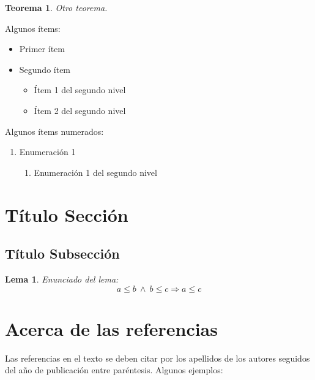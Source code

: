 \documentclass[10pt,twoside,spanish]{article}
\newtheorem{theorem}{Teorema}[section]
\newtheorem{lemma}{Lema}[section]
\numberwithin{equation}{section}
\begin{document}
\begin{theorem}
Otro teorema.
\end{theorem}

Algunos ítems:

\begin{itemize}
\item Primer ítem

\item Segundo ítem

\begin{itemize}
\item Ítem 1 del segundo nivel

\item Ítem 2 del segundo nivel
\end{itemize}
\end{itemize}

Algunos ítems numerados:

\begin{enumerate}
\item Enumeración 1

\begin{enumerate}
\item Enumeración 1 del segundo nivel
\end{enumerate}
\end{enumerate}

\section{Título Sección\label{Sec 2}}

\subsection{Título Subsección}

\begin{lemma}
Enunciado del lema:%
\begin{equation}
a\leq b~\wedge ~b\leq c\Rightarrow a\leq c  \label{Propiedad transitiva}
\end{equation}
\end{lemma}

\section{Acerca de las referencias}

Las referencias en el texto se deben citar por los apellidos de los autores
seguidos del año de publicación entre paréntesis. Algunos ejemplos:
\end{document}
